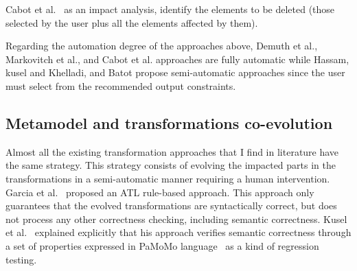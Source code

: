 
Cabot et al.~\cite{cabot2004automatic} as an impact analysis, identify the elements to be deleted (those selected by the user plus all the elements affected by them).

Regarding the automation degree of the approaches above, Demuth et al., Markovitch et al., and Cabot et al. \cite{10.1007/978-3-642-41533-3_18,markovic2008refactoring,cabot2004automatic}  approaches are fully automatic while Hassam, kusel and Khelladi, and Batot \cite{hassam2011assistance,kusel2014systematic,khelladi2017semi,8101267} propose semi-automatic approaches since the user must select from the recommended output constraints. 
\subsection{Metamodel and transformations co-evolution}

Almost all the existing transformation approaches that I find in literature have the same strategy. This strategy consists of evolving the impacted parts in the transformations in a semi-automatic manner requiring a human intervention. 
Garcia et al.~\cite{garcia2012model} proposed an ATL rule-based approach. This approach only guarantees that the evolved transformations are syntactically correct, but does not process any other correctness checking, including semantic correctness. %
  Kusel et al.~\cite{kusel2015consistent} explained explicitly that his approach verifies semantic correctness through a set of properties expressed in PaMoMo language~\cite{10.1007/s10515-012-0102-y} as a kind of regression testing.

